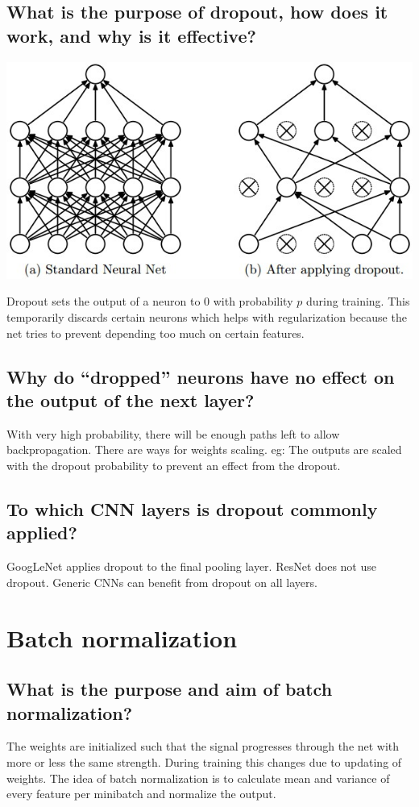 \subsection{What is the purpose of dropout, how does it work, and why is it effective?}
\begin{minipage}{0.4\textwidth}
\includegraphics[width=\textwidth]{./img/dropout.jpeg}
\end{minipage}
\begin{minipage}{0.6\textwidth}
Dropout sets the output of a neuron to 0 with probability $p$ during training. This temporarily discards certain neurons which helps with regularization because the net tries to prevent depending too much on certain features. 
\end{minipage}
\subsection{Why do ``dropped'' neurons have no effect on the output of the next layer?}
With very high probability, there will be enough paths left to allow backpropagation. There are ways for weights scaling. eg:
The outputs are scaled with the dropout probability to prevent an effect from the dropout.
\subsection{To which CNN layers is dropout commonly applied?}
GoogLeNet applies dropout to the final pooling layer. ResNet does not use dropout. Generic CNNs can benefit from dropout on all layers.
%
\section{Batch normalization}
\subsection{What is the purpose and aim of batch normalization?}
The weights are initialized such that the signal progresses through the net with more or less the same strength. During training this changes due to updating of weights. The idea of batch normalization is to calculate mean and variance of every feature per minibatch and normalize the output.

